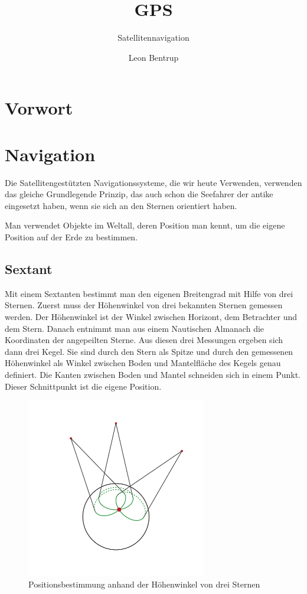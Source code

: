 \documentclass[12pt,a4paper]{scrartcl}
\author{Leon Bentrup}
\title{GPS}
\subtitle{Satellitennavigation}
\begin{document}
\maketitle
\tableofcontents
\newpage
{}

\section{Vorwort}
\section{Navigation}
Die Satellitengestützten Navigationssysteme, die wir heute Verwenden, verwenden das gleiche Grundlegende Prinzip, das auch schon die Seefahrer der antike eingesetzt haben, wenn sie sich an den Sternen orientiert haben.

Man verwendet Objekte im Weltall, deren Position man kennt, um die eigene Position auf der Erde zu bestimmen.

\subsection{Sextant}
Mit einem Sextanten bestimmt man den eigenen Breitengrad mit Hilfe von drei Sternen.
Zuerst muss der Höhenwinkel von drei bekannten Sternen gemessen werden. Der Höhenwinkel ist der Winkel zwischen Horizont, dem Betrachter und dem Stern.
Danach entnimmt man aus einem Nautischen Almanach die Koordinaten der angepeilten Sterne. Aus diesen drei Messungen ergeben sich dann drei Kegel. Sie sind durch den Stern als Spitze und durch den gemessenen Höhenwinkel als Winkel zwischen Boden und Mantelfläche des Kegels genau definiert. Die Kanten zwischen Boden und Mantel schneiden sich in einem Punkt. Dieser Schnittpunkt ist die eigene Position.

\begin{figure}[H]
\centering
\includegraphics[width=0.7\textwidth]{img/earth_cones.pdf}
\caption{Positionsbestimmung anhand der Höhenwinkel von drei Sternen}
\end{figure}
\end{document}
